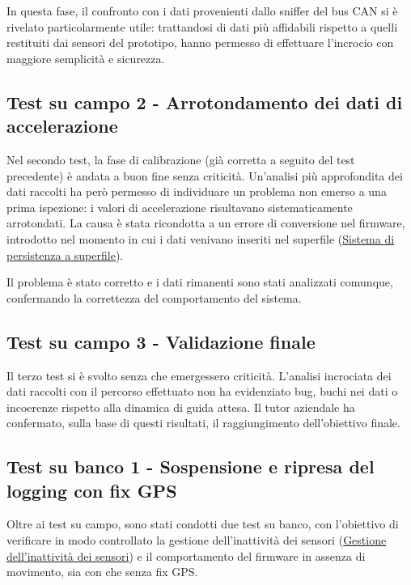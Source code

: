 In questa fase, il confronto con i dati provenienti dallo sniffer del bus CAN
si è rivelato particolarmente utile: trattandosi di dati più affidabili
rispetto a quelli restituiti dai sensori del prototipo, hanno permesso di
effettuare l'incrocio con maggiore semplicità e sicurezza.


\subsection{Test su campo 2 - Arrotondamento dei dati di accelerazione}
\label{subsubsec:test_campo_2}

Nel secondo test, la fase di calibrazione (già corretta a seguito del test
precedente) è andata a buon fine senza criticità. Un'analisi più
approfondita dei dati raccolti ha però permesso di individuare un problema
non emerso a una prima ispezione: i valori di accelerazione risultavano
sistematicamente arrotondati. La causa è stata ricondotta a un errore di
conversione nel firmware, introdotto nel momento in cui i dati venivano
inseriti nel superfile (\hyperref[sec:impl-superfile]{Sistema di persistenza
a superfile}).

Il problema è stato corretto e i dati rimanenti sono stati analizzati
comunque, confermando la correttezza del comportamento del sistema.

\subsection{Test su campo 3 - Validazione finale}
\label{subsubsec:test_campo_3}

Il terzo test si è svolto senza che emergessero criticità. L'analisi
incrociata dei dati raccolti con il percorso effettuato non ha evidenziato
bug, buchi nei dati o incoerenze rispetto alla dinamica di guida attesa. Il
tutor aziendale ha confermato, sulla base di questi risultati, il
raggiungimento dell'obiettivo finale.


\subsection{Test su banco 1 - Sospensione e ripresa del logging con fix GPS}
\label{subsubsec:test_banco_1}
\label{subsec:test_banco}

Oltre ai test su campo, sono stati condotti due test su banco, con
l'obiettivo di verificare in modo controllato la gestione dell'inattività
dei sensori (\hyperref[sec:inattivita]{Gestione dell'inattività dei
sensori}) e il comportamento del firmware in assenza di movimento, sia con
che senza fix GPS.

